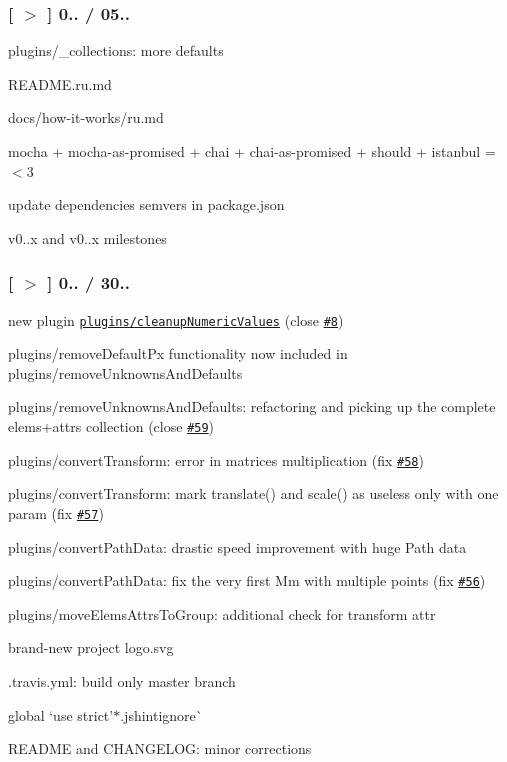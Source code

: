 \subsubsection*{\mbox{[} \href{https://github.com/svg/svgo/tree/v0.1.4}{\tt $>$} \mbox{]} 0.. / 05..}


\begin{DoxyItemize}
\item plugins/\+\_\+collections\+: more defaults
\item {\ttfamily R\+E\+A\+D\+M\+E.\+ru.\+md}
\item {\ttfamily docs/how-\/it-\/works/ru.\+md}
\item mocha + mocha-\/as-\/promised + chai + chai-\/as-\/promised + should + istanbul = $<$3
\item update dependencies semvers in {\ttfamily package.\+json}
\item {\ttfamily v0..\+x} and {\ttfamily v0..\+x} milestones
\end{DoxyItemize}

\subsubsection*{\mbox{[} \href{https://github.com/svg/svgo/tree/v0.1.3}{\tt $>$} \mbox{]} 0.. / 30..}


\begin{DoxyItemize}
\item new plugin \href{https://github.com/svg/svgo/blob/master/plugins/cleanupNumericValues.js}{\tt plugins/cleanup\+Numeric\+Values} (close \href{https://github.com/svg/svgo/issues/8}{\tt \#8})
\item plugins/remove\+Default\+Px functionality now included in plugins/remove\+Unknowns\+And\+Defaults
\item plugins/remove\+Unknowns\+And\+Defaults\+: refactoring and picking up the complete elems+attrs collection (close \href{https://github.com/svg/svgo/issues/59}{\tt \#59})
\item plugins/convert\+Transform\+: error in matrices multiplication (fix \href{https://github.com/svg/svgo/issues/58}{\tt \#58})
\item plugins/convert\+Transform\+: mark translate() and scale() as useless only with one param (fix \href{https://github.com/svg/svgo/issues/57}{\tt \#57})
\item plugins/convert\+Path\+Data\+: drastic speed improvement with huge Path data
\item plugins/convert\+Path\+Data\+: fix the very first Mm with multiple points (fix \href{https://github.com/svg/svgo/issues/56}{\tt \#56})
\item plugins/move\+Elems\+Attrs\+To\+Group\+: additional check for transform attr
\item brand-\/new project {\ttfamily logo.\+svg}
\item {\ttfamily .travis.\+yml}\+: build only master branch
\item global `\textquotesingle{}use strict'{\ttfamily  $\ast$}.jshintignore\`{}
\item R\+E\+A\+D\+ME and C\+H\+A\+N\+G\+E\+L\+OG\+: minor corrections
\end{DoxyItemize}

